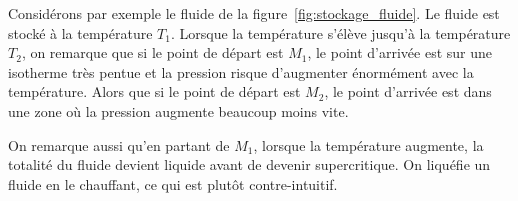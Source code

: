 \documentclass{cours}
\begin{document}
Considérons par exemple le fluide de la figure~\ref{fig:stockage_fluide}. Le fluide est stocké à la température $T_1$. Lorsque la température s'élève jusqu'à la température $T_2$, on remarque que si le point de départ est $M_1$, le point d'arrivée est sur une isotherme très pentue et la pression risque d'augmenter énormément avec la température. Alors que si le point de départ est $M_2$, le point d'arrivée est dans une zone où la pression augmente beaucoup moins vite.

On remarque aussi qu'en partant de $M_1$, lorsque la température augmente, la totalité du fluide devient liquide avant de devenir supercritique. On liquéfie un fluide en le chauffant, ce qui est plutôt contre-intuitif.
\end{document}
